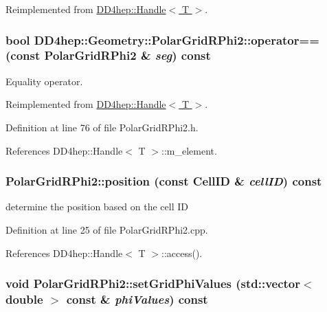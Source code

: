 Reimplemented from \hyperlink{class_d_d4hep_1_1_handle_a9bbf8f498df42e81ad26fb00233505a6}{DD4hep::Handle$<$ T $>$}.\hypertarget{class_d_d4hep_1_1_geometry_1_1_polar_grid_r_phi2_a06055e1c6d889eee992da2a8b51ba651}{
\subsubsection[{operator==}]{\setlength{\rightskip}{0pt plus 5cm}bool DD4hep::Geometry::PolarGridRPhi2::operator== (const {\bf PolarGridRPhi2} \& {\em seg}) const}}
\label{class_d_d4hep_1_1_geometry_1_1_polar_grid_r_phi2_a06055e1c6d889eee992da2a8b51ba651}


Equality operator. 

Reimplemented from \hyperlink{class_d_d4hep_1_1_handle_a618470283b3a2cc5ed0545fec90dc759}{DD4hep::Handle$<$ T $>$}.

Definition at line 76 of file PolarGridRPhi2.h.

References DD4hep::Handle$<$ T $>$::m\_\-element.\hypertarget{class_d_d4hep_1_1_geometry_1_1_polar_grid_r_phi2_a07da4b6472d023511e5b4320c7a6190f}{
\subsubsection[{position}]{ PolarGridRPhi2::position (const CellID \& {\em cellID}) const}}
\label{class_d_d4hep_1_1_geometry_1_1_polar_grid_r_phi2_a07da4b6472d023511e5b4320c7a6190f}


determine the position based on the cell ID 

Definition at line 25 of file PolarGridRPhi2.cpp.

References DD4hep::Handle$<$ T $>$::access().\hypertarget{class_d_d4hep_1_1_geometry_1_1_polar_grid_r_phi2_a02638a23a1a35ec7b1142a678c7c3a6e}{
\subsubsection[{setGridPhiValues}]{\setlength{\rightskip}{0pt plus 5cm}void PolarGridRPhi2::setGridPhiValues (std::vector$<$ double $>$ const \& {\em phiValues}) const}}
\label{class_d_d4hep_1_1_geometry_1_1_polar_grid_r_phi2_a02638a23a1a35ec7b1142a678c7c3a6e}


